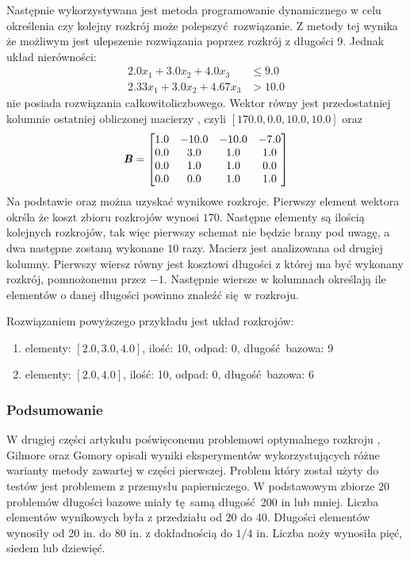 Następnie wykorzystywana jest metoda programowanie dynamicznego w celu określenia czy kolejny rozkrój może polepszyć rozwiązanie. Z metody tej wynika że możliwym jest ulepszenie rozwiązania poprzez rozkrój z długości 9. Jednak układ nierówności:
\begin{equation*}
  \begin{aligned}
    2.0 x_{1}+ 3.0 x_{2}+ 4.0 x_{3} &\le 9.0 \\
    2.33 x_{1}+ 3.0 x_{2}+ 4.67 x_{3} &> 10.0
  \end{aligned}
\end{equation*}
nie posiada rozwiązania całkowitoliczbowego. Wektor  równy jest przedostatniej kolumnie ostatniej obliczonej macierzy , czyli $[170.0,0.0,10.0,10.0]$ oraz
\begin{equation*}
  \textbf{\textit{B}} =
  \begin{bmatrix}
    1.0 & -10.0 & -10.0 & -7.0 \\
    0.0 & 3.0 & 1.0 & 1.0 \\
    0.0 & 1.0 & 1.0 & 0.0 \\
    0.0 & 0.0 & 1.0 & 1.0
  \end{bmatrix}
\end{equation*}
Na podstawie  oraz  można uzyskać wynikowe rozkroje. Pierwszy element wektora  okrśla że koszt zbioru rozkrojów wynosi $170$. Następne elementy są ilością kolejnych rozkrojów, tak więc pierwszy schemat nie będzie brany pod uwagę, a dwa następne zostaną wykonane $10$ razy. Macierz  jest analizowana od drugiej kolumny. Pierwszy wiersz równy jest kosztowi długości z której ma być wykonany rozkrój, pomnożonemu przez $-1$. Następnie wiersze w kolumnach określają ile elementów o danej długości powinno znaleźć się w rozkroju.

Rozwiązaniem powyższego przykładu jest układ rozkrojów:
\begin{enumerate}
  \item  elementy: $[2.0,3.0,4.0]$, ilość: 10, odpad: 0, długość bazowa: 9
  \item  elementy: $[2.0,4.0]$, ilość: 10, odpad: 0, długość bazowa: 6
\end{enumerate}
\subsubsection{Podsumowanie} \label{sec:summary}
W drugiej części artykułu poświęconemu problemowi optymalnego rozkroju \cite{GilmoreGomoryV2Article}, Gilmore oraz Gomory opisali wyniki eksperymentów wykorzystujących różne warianty metody zawartej w części pierwszej. Problem który został użyty do testów jest problemem z przemysłu papierniczego. W podstawowym zbiorze 20 problemów długości bazowe miały tę samą długość 200 in lub mniej. Liczba elementów wynikowych była z przedziału od 20 do 40. Długości elementów wynosiły od 20 in. do 80 in. z dokładnością do $1/4$ in. Liczba noży wynosiła pięć, siedem lub dziewięć.


